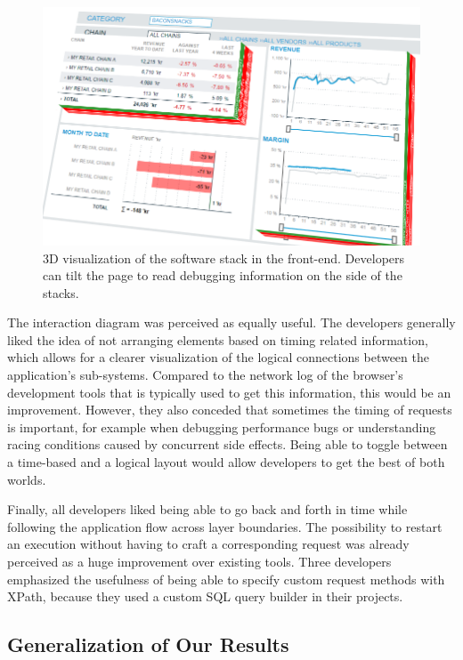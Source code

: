 \documentclass[
      english,
			conference,
      ]{IEEEtran}
\begin{document}
\begin{figure}
	\centering
		\includegraphics[width=1.00\linewidth]{pos3d.png}
	\caption{3D visualization of the software stack in the front-end. Developers can tilt the page to read debugging information on the side of the stacks.}
	\label{fig:3d}
\end{figure}

The interaction diagram was perceived as equally useful.
The developers generally liked the idea of not arranging elements based on timing related information, which allows for a clearer visualization of the logical connections between the application's sub-systems.
Compared to the network log of the browser's development tools that is typically used to get this information, this would be an improvement.
However, they also conceded that sometimes the timing of requests is important, for example when debugging performance bugs or understanding racing conditions caused by concurrent side effects.
Being able to toggle between a time-based and a logical layout would allow developers to get the best of both worlds.

Finally, all developers liked being able to go back and forth in time while following the application flow across layer boundaries.
The possibility to restart an execution without having to craft a corresponding request was already perceived as a huge improvement over existing tools.
Three developers emphasized the usefulness of being able to specify custom request methods with XPath, because they used a custom SQL query builder in their projects.

\subsection{Generalization of Our Results}
\end{document}
